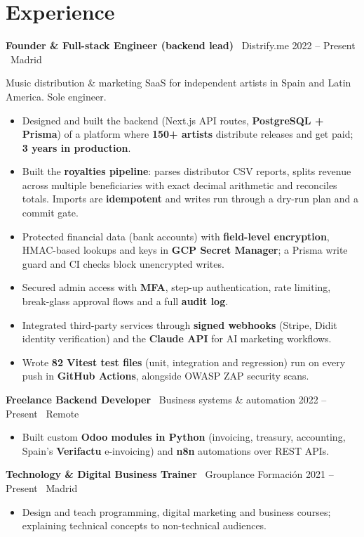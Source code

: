 \documentclass[10pt,a4paper]{article}
\newcommand{\job}[4]{%
  \par\vspace{4pt}\textbf{#1} \textperiodcentered\ #2 \hfill {\color{muted}#3 \textperiodcentered\ #4}\par}
\begin{document}
\section{Experience}

\job{Founder \& Full-stack Engineer (backend lead)}{Distrify.me}{2022 -- Present}{Madrid}
{\small\color{muted} Music distribution \& marketing SaaS for independent artists in Spain and Latin America. Sole engineer.}
\begin{itemize}
  \item Designed and built the backend (Next.js API routes, \textbf{PostgreSQL + Prisma}) of a platform where \textbf{150+ artists} distribute releases and get paid; \textbf{3 years in production}.
  \item Built the \textbf{royalties pipeline}: parses distributor CSV reports, splits revenue across multiple beneficiaries with exact decimal arithmetic and reconciles totals. Imports are \textbf{idempotent} and writes run through a dry-run plan and a commit gate.
  \item Protected financial data (bank accounts) with \textbf{field-level encryption}, HMAC-based lookups and keys in \textbf{GCP Secret Manager}; a Prisma write guard and CI checks block unencrypted writes.
  \item Secured admin access with \textbf{MFA}, step-up authentication, rate limiting, break-glass approval flows and a full \textbf{audit log}.
  \item Integrated third-party services through \textbf{signed webhooks} (Stripe, Didit identity verification) and the \textbf{Claude API} for AI marketing workflows.
  \item Wrote \textbf{82 Vitest test files} (unit, integration and regression) run on every push in \textbf{GitHub Actions}, alongside OWASP ZAP security scans.
\end{itemize}

\job{Freelance Backend Developer}{Business systems \& automation}{2022 -- Present}{Remote}  %
\begin{itemize}
  \item Built custom \textbf{Odoo modules in Python} (invoicing, treasury, accounting, Spain's \textbf{Verifactu} e-invoicing) and \textbf{n8n} automations over REST APIs.
\end{itemize}

\job{Technology \& Digital Business Trainer}{Grouplance Formaci\'on}{2021 -- Present}{Madrid}
\begin{itemize}
  \item Design and teach programming, digital marketing and business courses; explaining technical concepts to non-technical audiences.
\end{itemize}
\end{document}
